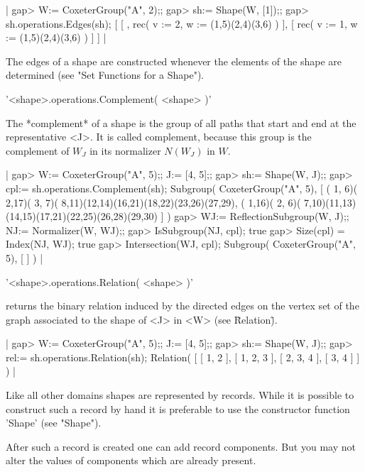 |    gap> W:= CoxeterGroup("A", 2);;
    gap> sh:= Shape(W, [1]);;
    gap> sh.operations.Edges(sh);  
    [ [ , rec(
              v := 2,
              w := (1,5)(2,4)(3,6) ) ], [ rec(
              v := 1,
              w := (1,5)(2,4)(3,6) ) ] ] |
              
The edges of  a shape are constructed whenever the  elements of the shape
are determined (see "Set Functions for a Shape").


'<shape>.operations.Complement( <shape> )'

The *complement* of a shape is the group of all paths that
start and end at the representative <J>.  It is called complement,
because this group is the complement of $W_J$  in its normalizer
$N(W_J)$ in $W$.

|    gap> W:= CoxeterGroup("A", 5);;  J:= [4, 5];;
    gap> sh:= Shape(W, J);;
    gap> cpl:= sh.operations.Complement(sh);
    Subgroup( CoxeterGroup("A", 5),
    [ ( 1, 6)( 2,17)( 3, 7)( 8,11)(12,14)(16,21)(18,22)(23,26)(27,29),
      ( 1,16)( 2, 6)( 7,10)(11,13)(14,15)(17,21)(22,25)(26,28)(29,30) ] )
    gap> WJ:= ReflectionSubgroup(W, J);; NJ:= Normalizer(W, WJ);;
    gap> IsSubgroup(NJ, cpl);
    true
    gap> Size(cpl) = Index(NJ, WJ);
    true
    gap> Intersection(WJ, cpl);
    Subgroup( CoxeterGroup("A", 5), [  ] ) |



'<shape>.operations.Relation( <shape> )'

returns the binary  relation induced by the directed  edges on the vertex
set of the graph associated to the shape of <J> in <W> (see \"Relation\").

|    gap> W:= CoxeterGroup("A", 5);;  J:= [4, 5];;
    gap> sh:= Shape(W, J);;
    gap> rel:= sh.operations.Relation(sh);
    Relation( [ [ 1, 2 ], [ 1, 2, 3 ], [ 2, 3, 4 ], [ 3, 4 ] ] ) |


Like all  other domains shapes are  represented by records.   While it is
possible to construct  such a record by hand it is  preferable to use the
constructor function 'Shape' (see "Shape").

After such  a record is  created one can add  record components.  But you
may not alter the values of components which are already present.

